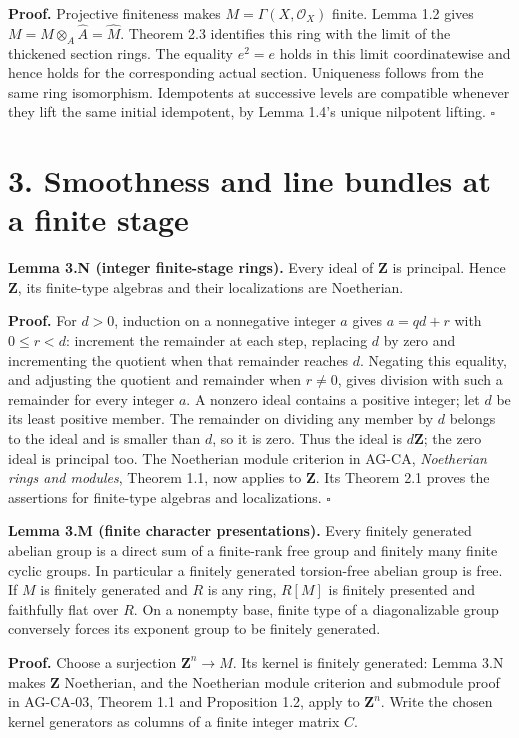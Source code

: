 \documentclass[11pt,a4paper,openany]{report}
\newcounter{none}
\begin{document}
\textbf{Proof.} Projective finiteness makes \(M=\Gamma(X,\mathcal O_X)\) finite. Lemma 1.2 gives \(M=M\otimes_A\widehat A=\widehat M\). Theorem 2.3 identifies this ring with the limit of the thickened section rings. The equality \(e^2=e\) holds in this limit coordinatewise and hence holds for the corresponding actual section. Uniqueness follows from the same ring isomorphism. Idempotents at successive levels are compatible whenever they lift the same initial idempotent, by Lemma 1.4's unique nilpotent lifting. \(\square\)

\section{3. Smoothness and line bundles at a finite stage}\label{AG-RG-S02-smoothness-and-line-bundles-at-a-finite-stage}

\textbf{Lemma 3.N (integer finite-stage rings).} Every ideal of \(\mathbf Z\) is principal. Hence \(\mathbf Z\), its finite-type algebras and their localizations are Noetherian.

\textbf{Proof.} For \(d>0\), induction on a nonnegative integer \(a\) gives \(a=qd+r\) with \(0\leq r<d\): increment the remainder at each step, replacing \(d\) by zero and incrementing the quotient when that remainder reaches \(d\). Negating this equality, and adjusting the quotient and remainder when \(r\ne0\), gives division with such a remainder for every integer \(a\). A nonzero ideal contains a positive integer; let \(d\) be its least positive member. The remainder on dividing any member by \(d\) belongs to the ideal and is smaller than \(d\), so it is zero. Thus the ideal is \(d\mathbf Z\); the zero ideal is principal too. The Noetherian module criterion in AG-CA, \emph{Noetherian rings and modules}, Theorem 1.1, now applies to \(\mathbf Z\). Its Theorem 2.1 proves the assertions for finite-type algebras and localizations. \(\square\)

\textbf{Lemma 3.M (finite character presentations).} Every finitely generated abelian group is a direct sum of a finite-rank free group and finitely many finite cyclic groups. In particular a finitely generated torsion-free abelian group is free. If \(M\) is finitely generated and \(R\) is any ring, \(R[M]\) is finitely presented and faithfully flat over \(R\). On a nonempty base, finite type of a diagonalizable group conversely forces its exponent group to be finitely generated.

\textbf{Proof.} Choose a surjection \(\mathbf Z^n\to M\). Its kernel is finitely generated: Lemma 3.N makes \(\mathbf Z\) Noetherian, and the Noetherian module criterion and submodule proof in AG-CA-03, Theorem 1.1 and Proposition 1.2, apply to \(\mathbf Z^n\). Write the chosen kernel generators as columns of a finite integer matrix \(C\).
\end{document}
